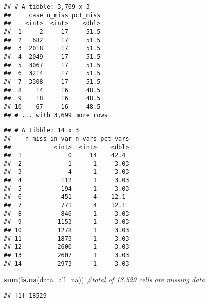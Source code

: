 \documentclass[]{article}
\newenvironment{Shaded}{\begin{snugshade}}{\end{snugshade}}
\newcommand{\KeywordTok}[1]{\textcolor[rgb]{0.13,0.29,0.53}{\textbf{#1}}}
\newcommand{\StringTok}[1]{\textcolor[rgb]{0.31,0.60,0.02}{#1}}
\newcommand{\CommentTok}[1]{\textcolor[rgb]{0.56,0.35,0.01}{\textit{#1}}}
\newcommand{\NormalTok}[1]{#1}
\begin{document}
\begin{verbatim}
## # A tibble: 3,709 x 3
##     case n_miss pct_miss
##    <int>  <int>    <dbl>
##  1     2     17     51.5
##  2   682     17     51.5
##  3  2018     17     51.5
##  4  2049     17     51.5
##  5  3067     17     51.5
##  6  3214     17     51.5
##  7  3308     17     51.5
##  8    14     16     48.5
##  9    18     16     48.5
## 10    67     16     48.5
## # ... with 3,699 more rows
\end{verbatim}

\begin{Shaded}
\end{Shaded}

\begin{verbatim}
## # A tibble: 14 x 3
##    n_miss_in_var n_vars pct_vars
##            <int>  <int>    <dbl>
##  1             0     14    42.4 
##  2             1      1     3.03
##  3             4      1     3.03
##  4           112      1     3.03
##  5           194      1     3.03
##  6           451      4    12.1 
##  7           771      4    12.1 
##  8           846      1     3.03
##  9          1153      1     3.03
## 10          1278      1     3.03
## 11          1873      1     3.03
## 12          2600      1     3.03
## 13          2607      1     3.03
## 14          2973      1     3.03
\end{verbatim}

\begin{Shaded}
\begin{Highlighting}[]
\KeywordTok{sum}\NormalTok{(}\KeywordTok{is.na}\NormalTok{(data_all_na)) }\CommentTok{#total of 18,529 cells are missing data}
\end{Highlighting}
\end{Shaded}

\begin{verbatim}
## [1] 18529
\end{verbatim}
\end{document}
